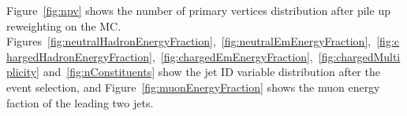 

Figure~\ref{fig:npv} shows the number of primary vertices distribution after pile up reweighting on the MC. 
Figures~\ref{fig:neutralHadronEnergyFraction},~\ref{fig:neutralEmEnergyFraction},~\ref{fig:chargedHadronEnergyFraction},~\ref{fig:chargedEmEnergyFraction},~\ref{fig:chargedMultiplicity} and~\ref{fig:nConstituents} show the jet ID variable distribution after the event selection, and Figure~\ref{fig:muonEnergyFraction} shows the muon energy faction of the leading two jets.

\clearpage
